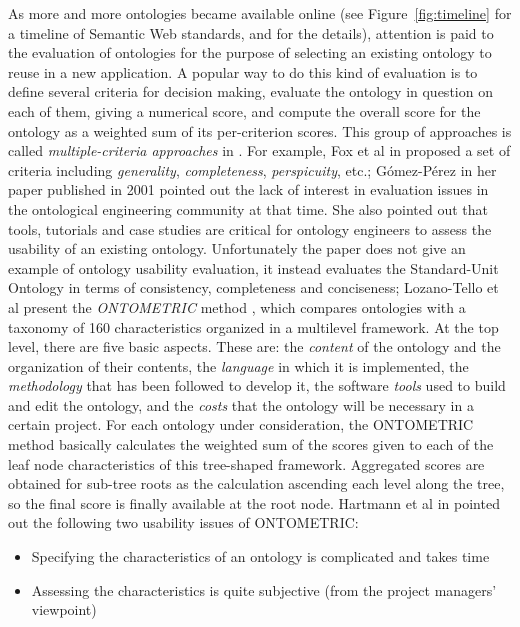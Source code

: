 As more and more ontologies became available online (see Figure~\ref{fig:timeline} for a timeline of Semantic Web standards, and \cite{bikakis2013xml} for the details), attention is paid to the evaluation of ontologies for the purpose of selecting an existing ontology to reuse in a new application. A popular way to do this kind of evaluation is to define several criteria for decision making, evaluate the ontology in question on each of them, giving a numerical score, and compute the overall score for the ontology as a weighted sum of its per-criterion scores. This group of approaches is called \emph{multiple-criteria approaches} in \cite{brank2005survey}. For example, Fox et al in \cite{fox1995organisation} proposed a set of criteria including \emph{generality}, \emph{completeness}, \emph{perspicuity}, etc.; G{\'o}mez-P{\'e}rez in her paper \cite{gomez2001evaluation} published in 2001 pointed out the lack of interest in evaluation issues in the ontological engineering community at that time. She also pointed out that tools, tutorials and case studies are critical for ontology engineers to assess the usability of an existing ontology. Unfortunately the paper does not give an example of ontology usability evaluation, it instead evaluates the Standard-Unit Ontology in terms of consistency, completeness and conciseness; Lozano-Tello et al present the \emph{ONTOMETRIC} method \cite{lozano2003selection,lozano2004ontometric}, which compares ontologies with a taxonomy of
160 characteristics organized in a multilevel framework. At the top level, there are five basic aspects. These are: the \emph{content} of the ontology and the
organization of their contents, the \emph{language}
in which it is implemented, the \emph{methodology}
that has been followed to develop it,
the software \emph{tools} used to build and edit
the ontology, and the \emph{costs} that the ontology
will be necessary in a certain project. For each ontology under consideration, the ONTOMETRIC method basically calculates the weighted sum of the scores given to each of the leaf node characteristics of this tree-shaped framework. Aggregated scores are obtained for sub-tree roots as the calculation ascending each level along the tree, so the final score is finally available at the root node. Hartmann et al in \cite{hartmann2005d1} pointed out the following two usability issues of ONTOMETRIC:
\begin{itemize}
	\item Specifying the characteristics of an ontology
	is complicated and takes time
	\item Assessing
	the characteristics is quite subjective (from the
	project managers' viewpoint)
\end{itemize} 

